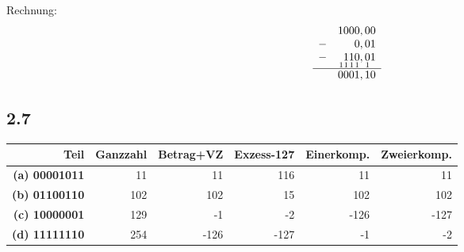 \documentclass[12pt,a4paper]{article}
\newcommand\T{\rule{0pt}{2.6ex}}
\begin{document}
 Rechnung:
 $$\begin{array}{r r}
 & 1000,00\\
 -&   0,01\\
 -&\underset{1}{\;}\underset{1}{1}\underset{1}{1}\underset{1}{0},\underset{1}{0}1\\
 \hline
 &0001,10
 \end{array}$$
 
 \subsection*{2.7} 
 \begin{center}

 \begin{tabular}{r||r|r|r|r|r}
 Teil & Ganzzahl & Betrag+VZ & Exzess-127 & Einerkomp. & Zweierkomp.\\
 \hline \T
 \textbf{(a) 00001011} &  11 &   11&  116&   11&   11\\
 \textbf{(b) 01100110} & 102 &  102&   15&  102&  102\\
 \textbf{(c) 10000001} & 129 &   -1&   -2& -126& -127\\
 \textbf{(d) 11111110} & 254 & -126& -127&   -1&   -2\\
 \end{tabular}
\end{center}
\end{document}
